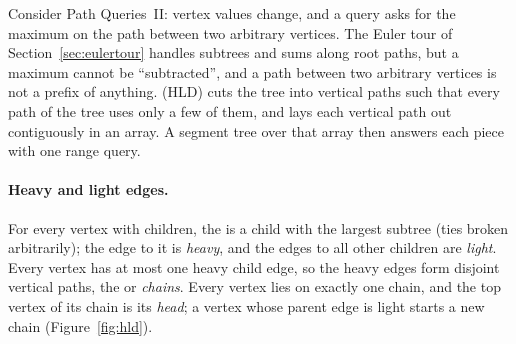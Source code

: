 Consider Path Queries~II: vertex values change, and a query asks for the maximum on the path between two arbitrary vertices. The
Euler tour of Section~\ref{sec:eulertour} handles subtrees and sums along root paths, but a maximum cannot be ``subtracted'', and a
path between two arbitrary vertices is not a prefix of anything.  (HLD) cuts the tree into
vertical paths such that every path of the tree uses only a few of them, and lays each vertical path out contiguously in an
array. A segment tree over that array then answers each piece with one range query.

\paragraph{Heavy and light edges.} For every vertex with children, the  is a child with the largest subtree
(ties broken arbitrarily); the edge to it is \emph{heavy}, and the edges to all other children are \emph{light}. Every vertex has at
most one heavy child edge, so the heavy edges form disjoint vertical paths, the  or \emph{chains}. Every vertex
lies on exactly one chain, and the top vertex of its chain is its \emph{head}; a vertex whose parent edge is light starts a new
chain (Figure~\ref{fig:hld}).

